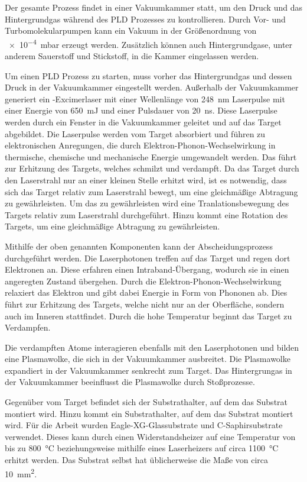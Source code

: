 Der gesamte Prozess findet in einer Vakuumkammer statt, um den Druck und das Hintergrundgas während des PLD Prozesses zu
kontrollieren.
Durch Vor- und Turbomolekularpumpen kann ein Vakuum in der Größenordnung von \qty{e-4}{\milli\bar} erzeugt werden.
Zusätzlich können auch Hintergrundgase, unter anderem Sauerstoff und Stickstoff, in die Kammer eingelassen werden.

Um einen PLD Prozess zu starten, muss vorher das Hintergrundgas und dessen Druck in der Vakuumkammer eingestellt werden.
Außerhalb der Vakuumkammer generiert ein -Excimerlaser mit einer Wellenlänge von \qty{248}{\nano\meter}
Laserpulse mit einer Energie von \qty{650}{\milli\joule} und einer Pulsdauer von \qty{20}{\nano\second}.
Diese Laserpulse werden durch ein Fenster in die Vakuumkammer geleitet und auf das Target abgebildet.
Die Laserpulse werden vom Target absorbiert und führen zu elektronischen Anregungen, die durch
Elektron-Phonon-Wechselwirkung in thermische, chemische und mechanische Energie umgewandelt werden.
Das führt zur Erhitzung des Targets, welches schmilzt und verdampft.
Da das Target durch den Laserstrahl nur an einer kleinen Stelle erhitzt wird, ist es notwendig,
dass sich das Target relativ zum Laserstrahl bewegt, um eine gleichmäßige Abtragung zu gewährleisten.
Um das zu gewährleisten wird eine Tranlationsbewegung des Targets relativ zum Laserstrahl durchgeführt.
Hinzu kommt eine Rotation des Targets, um eine gleichmäßige Abtragung zu gewährleisten.

Mithilfe der oben genannten Komponenten kann der Abscheidungsprozess durchgeführt werden.
Die Laserphotonen treffen auf das Target und regen dort Elektronen an.
Diese erfahren einen Intraband-Übergang, wodurch sie in einen angeregten Zustand übergehen.
Durch die Elektron-Phonon-Wechselwirkung relaxiert das Elektron und gibt dabei Energie in Form von Phononen ab.
Dies führt zur Erhitzung des Targets, welche nicht nur an der Oberfläche, sondern auch im Inneren stattfindet.
Durch die hohe Temperatur beginnt das Target zu Verdampfen.

Die verdampften Atome interagieren ebenfalls mit den Laserphotonen und bilden eine Plasmawolke, die sich in der
Vakuumkammer ausbreitet.
Die Plasmawolke expandiert in der Vakuumkammer senkrecht zum Target.
Das Hintergrungas in der Vakuumkammer beeinflusst die Plasmawolke durch Stoßprozesse.

Gegenüber vom Target befindet sich der Substrathalter, auf dem das Substrat montiert wird.
Hinzu kommt ein Substrathalter, auf dem das Substrat montiert wird.
Für die Arbeit wurden Eagle-XG-Glassubstrate und C-Saphirsubstrate verwendet.
Dieses kann durch einen Widerstandsheizer auf eine Temperatur von bis zu \qty{800}{\celsius} beziehungsweise
mithilfe eines Laserheizers auf circa \qty{1100}{\celsius} erhitzt werden.
Das Substrat selbst hat üblicherweise die Maße von circa \qty{10}{\milli\meter\squared}.


